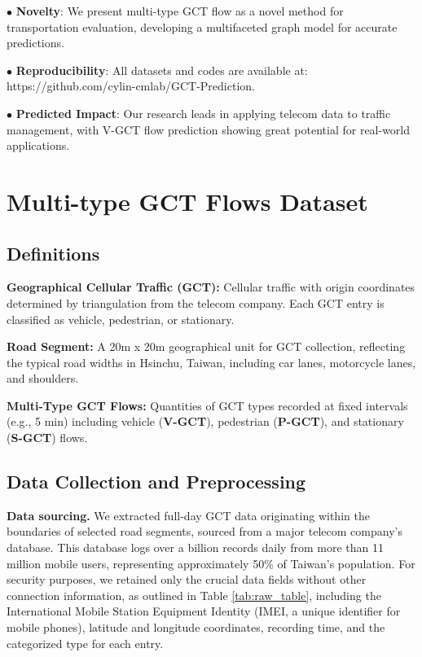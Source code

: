 \documentclass[letterpaper]{article} %
\begin{document}
$\bullet$ \textbf{Novelty}: We present multi-type GCT flow as a novel method for transportation evaluation, developing a multifaceted graph model for accurate predictions.

$\bullet$ \textbf{Reproducibility}: All datasets and codes are available at: https://github.com/cylin-cmlab/GCT-Prediction.

$\bullet$ \textbf{Predicted Impact}: Our research leads in applying telecom data to traffic management, with V-GCT flow prediction showing great potential for real-world applications.

\clearpage

\section{Multi-type GCT Flows Dataset}
\subsection{Definitions}

\noindent \textbf{Geographical Cellular Traffic (GCT):} Cellular traffic with origin coordinates determined by triangulation \cite{jiang2013review} from the telecom company. Each GCT entry is classified as vehicle, pedestrian, or stationary.

\noindent \textbf{Road Segment:} A 20m x 20m geographical unit for GCT collection, reflecting the typical road widths in Hsinchu, Taiwan, including car lanes, motorcycle lanes, and shoulders. 

\noindent \textbf{Multi-Type GCT Flows:} Quantities of GCT types recorded at fixed intervals (e.g., 5 min) including vehicle (\textbf{V-GCT}), pedestrian (\textbf{P-GCT}), and stationary (\textbf{S-GCT}) flows.
\subsection{Data Collection and Preprocessing}
\textbf{Data sourcing.} 
We extracted full-day GCT data originating within the boundaries of selected road segments, sourced from a major telecom company's database. This database logs over a billion records daily from more than 11 million mobile users, representing approximately 50\% of Taiwan's population. For security purposes, we retained only the crucial data fields without other connection information, as outlined in Table \ref{tab:raw_table}, including the International Mobile Station Equipment Identity (IMEI, a unique identifier for mobile phones), latitude and longitude coordinates, recording time, and the categorized type for each entry.
\end{document}
